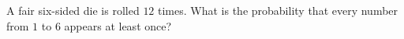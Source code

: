 A fair six-sided die is rolled $12$ times. What is the probability that every number from $1$ to $6$ appears at least once?
